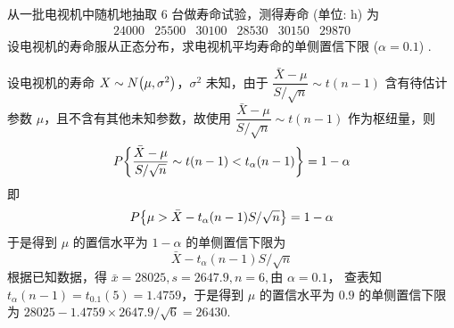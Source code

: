 \begin{example}
    从一批电视机中随机地抽取 $6$ 台做寿命试验，测得寿命 (单位: h) 为
    $$\begin{array}{llllll}
            24000 & 25500 & 30100 & 28530 & 30150 & 29870
        \end{array}$$
    设电视机的寿命服从正态分布，求电视机平均寿命的单侧置信下限 ($\alpha=0.1$) .
\end{example}
\begin{solution}
    设电视机的寿命 $X\sim N\qty(\mu,\sigma^2)$，$\sigma^2$ 未知，由于 $\dfrac{\bar{X}-\mu}{S/\sqrt{n}}\sim t(n-1)$ 含有待估计参数 $\mu$，且不含有其他未知参数，故使用 $\dfrac{\bar{X}-\mu}{S/\sqrt{n}}\sim t(n-1)$ 作为枢纽量，则 
    $$P\qty{\dfrac{\bar{X}-\mu}{S/\sqrt{n}}\sim t(n-1)<t_{\alpha}(n-1)}=1-\alpha$$
    即 
    $$P\qty{\mu>\bar{X}-t_{\alpha}(n-1)S/\sqrt{n}}=1-\alpha$$
    于是得到 $\mu$ 的置信水平为 $1-\alpha$ 的单侧置信下限为 $$\bar{X}-t_{\alpha}(n-1)S/\sqrt{n}$$
    根据已知数据，得 $ \bar{x}=28025, s=2647.9, n=6 , $由 $ \alpha=0.1 $，
    查表知 $ t_{\alpha}(n-1)=t_{0.1}(5)=  1.4759 $，于是得到 $ \mu $ 的置信水平为 $0.9$ 的单侧置信下限为 $ 28025-1.4759 \times 2647.9 / \sqrt{6}=  26430.$
\end{solution}